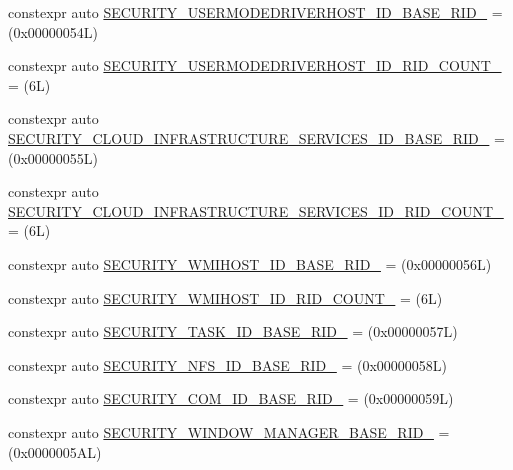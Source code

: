 \begin{DoxyCompactItemize}
\item 
constexpr auto \mbox{\hyperlink{namespaceboost_1_1winapi_ae98c8732c09a08d6a6e5a56ad31ff2fb}{S\+E\+C\+U\+R\+I\+T\+Y\+\_\+\+U\+S\+E\+R\+M\+O\+D\+E\+D\+R\+I\+V\+E\+R\+H\+O\+S\+T\+\_\+\+I\+D\+\_\+\+B\+A\+S\+E\+\_\+\+R\+I\+D\+\_\+}} = (0x00000054\+L)
\item 
constexpr auto \mbox{\hyperlink{namespaceboost_1_1winapi_a4c65782ae47831ce41dfc10f39e169ca}{S\+E\+C\+U\+R\+I\+T\+Y\+\_\+\+U\+S\+E\+R\+M\+O\+D\+E\+D\+R\+I\+V\+E\+R\+H\+O\+S\+T\+\_\+\+I\+D\+\_\+\+R\+I\+D\+\_\+\+C\+O\+U\+N\+T\+\_\+}} = (6\+L)
\item 
constexpr auto \mbox{\hyperlink{namespaceboost_1_1winapi_aa45ea3f79cddf1aa708425b5cae394b8}{S\+E\+C\+U\+R\+I\+T\+Y\+\_\+\+C\+L\+O\+U\+D\+\_\+\+I\+N\+F\+R\+A\+S\+T\+R\+U\+C\+T\+U\+R\+E\+\_\+\+S\+E\+R\+V\+I\+C\+E\+S\+\_\+\+I\+D\+\_\+\+B\+A\+S\+E\+\_\+\+R\+I\+D\+\_\+}} = (0x00000055\+L)
\item 
constexpr auto \mbox{\hyperlink{namespaceboost_1_1winapi_a2b2a3e9ee2beeec02caa4c539bd11010}{S\+E\+C\+U\+R\+I\+T\+Y\+\_\+\+C\+L\+O\+U\+D\+\_\+\+I\+N\+F\+R\+A\+S\+T\+R\+U\+C\+T\+U\+R\+E\+\_\+\+S\+E\+R\+V\+I\+C\+E\+S\+\_\+\+I\+D\+\_\+\+R\+I\+D\+\_\+\+C\+O\+U\+N\+T\+\_\+}} = (6\+L)
\item 
constexpr auto \mbox{\hyperlink{namespaceboost_1_1winapi_aa0e6bdd8156ddc6d3c1f5cd1e4f70670}{S\+E\+C\+U\+R\+I\+T\+Y\+\_\+\+W\+M\+I\+H\+O\+S\+T\+\_\+\+I\+D\+\_\+\+B\+A\+S\+E\+\_\+\+R\+I\+D\+\_\+}} = (0x00000056\+L)
\item 
constexpr auto \mbox{\hyperlink{namespaceboost_1_1winapi_ae647cd90d585f9b4b59aa2add85f64b3}{S\+E\+C\+U\+R\+I\+T\+Y\+\_\+\+W\+M\+I\+H\+O\+S\+T\+\_\+\+I\+D\+\_\+\+R\+I\+D\+\_\+\+C\+O\+U\+N\+T\+\_\+}} = (6\+L)
\item 
constexpr auto \mbox{\hyperlink{namespaceboost_1_1winapi_a78d25265e24c367dee7ac2f368df641b}{S\+E\+C\+U\+R\+I\+T\+Y\+\_\+\+T\+A\+S\+K\+\_\+\+I\+D\+\_\+\+B\+A\+S\+E\+\_\+\+R\+I\+D\+\_\+}} = (0x00000057\+L)
\item 
constexpr auto \mbox{\hyperlink{namespaceboost_1_1winapi_a70b293280d605f1b8e2705c47973f742}{S\+E\+C\+U\+R\+I\+T\+Y\+\_\+\+N\+F\+S\+\_\+\+I\+D\+\_\+\+B\+A\+S\+E\+\_\+\+R\+I\+D\+\_\+}} = (0x00000058\+L)
\item 
constexpr auto \mbox{\hyperlink{namespaceboost_1_1winapi_a57752dea43cff6d6a1e45d54e1cddec5}{S\+E\+C\+U\+R\+I\+T\+Y\+\_\+\+C\+O\+M\+\_\+\+I\+D\+\_\+\+B\+A\+S\+E\+\_\+\+R\+I\+D\+\_\+}} = (0x00000059\+L)
\item 
constexpr auto \mbox{\hyperlink{namespaceboost_1_1winapi_ae710219b28779641a012cfd98f899895}{S\+E\+C\+U\+R\+I\+T\+Y\+\_\+\+W\+I\+N\+D\+O\+W\+\_\+\+M\+A\+N\+A\+G\+E\+R\+\_\+\+B\+A\+S\+E\+\_\+\+R\+I\+D\+\_\+}} = (0x0000005\+A\+L)

\end{DoxyCompactItemize}
